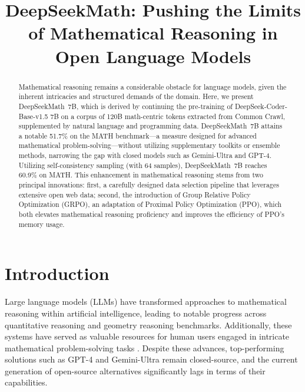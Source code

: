 \title{DeepSeekMath: Pushing the Limits of Mathematical Reasoning in Open Language Models}

\begin{abstract}
Mathematical reasoning remains a considerable obstacle for language models, given the inherent intricacies and structured demands of the domain. Here, we present DeepSeekMath~7B, which is derived by continuing the pre-training of DeepSeek-Coder-Base-v1.5 7B on a corpus of 120B math-centric tokens extracted from Common Crawl, supplemented by natural language and programming data. DeepSeekMath~7B attains a notable 51.7\% on the MATH benchmark—a measure designed for advanced mathematical problem-solving—without utilizing supplementary toolkits or ensemble methods, narrowing the gap with closed models such as Gemini-Ultra and GPT-4. Utilizing self-consistency sampling (with 64 samples), DeepSeekMath~7B reaches 60.9\% on MATH. This enhancement in mathematical reasoning stems from two principal innovations: first, a carefully designed data selection pipeline that leverages extensive open web data; second, the introduction of Group Relative Policy Optimization (GRPO), an adaptation of Proximal Policy Optimization (PPO), which both elevates mathematical reasoning proficiency and improves the efficiency of PPO's memory usage.
\end{abstract}

\section{Introduction}

Large language models (LLMs) have transformed approaches to mathematical reasoning within artificial intelligence, leading to notable progress across quantitative reasoning \citep{MATH} and geometry reasoning \citep{trinh2024solving} benchmarks. Additionally, these systems have served as valuable resources for human users engaged in intricate mathematical problem-solving tasks \citep{tao}. Despite these advances, top-performing solutions such as GPT-4 \citep{gpt4} and Gemini-Ultra \citep{gemini} remain closed-source, and the current generation of open-source alternatives significantly lags in terms of their capabilities.

